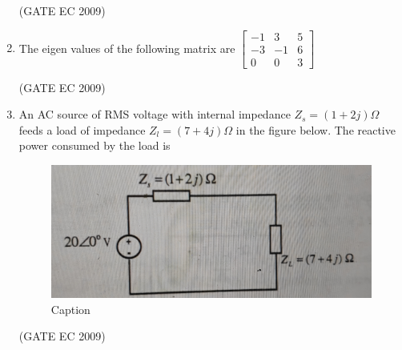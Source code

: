 \documentclass[journal,12pt,onecolumn]{IEEEtran}
\theoremstyle{remark}
\begin{document}
\begin{enumerate}[start=1, label={Q\arabic*.}]
\begin{enumerate}[label=(\Alph*)]
\end{enumerate}
\hfill (GATE EC 2009)

\item The eigen values of the following matrix are 
$
\begin{bmatrix}
    -1 &3&5\\
    -3&-1&6\\
    0&0&3
\end{bmatrix}
$

\begin{enumerate}[label=(\Alph*)]
\end{enumerate}
\hfill (GATE EC 2009)

\item An AC source of RMS voltage with internal impedance $Z_s = (1+2j) \Omega$ feeds a load of impedance $Z_l = (7+4j) \Omega$ in the figure below. The reactive power consumed by the load is 
\begin{figure}[H]
    \centering
    \includegraphics[width=0.5\linewidth]{images/img_9.jpg}
    \caption{Caption}
    \label{fig:placeholder}
\end{figure}
\begin{enumerate}[label=(\Alph*)]
\end{enumerate}
\hfill (GATE EC 2009)


\end{enumerate}
\end{document}
